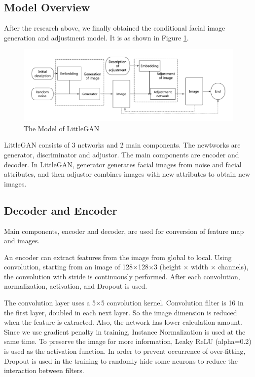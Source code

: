 \subsection{Model Overview}

After the research above, we finally obtained the conditional facial image generation and adjustment model.
 It is as shown in Figure \ref{smliegan}.

\begin{figure}
    \begin{center}
    \includegraphics[width=\textwidth]{figures/model.pdf}
    \caption{The Model of LittleGAN}
    \label{smliegan}
    \end{center}
\end{figure}

LittleGAN consists of 3 networks and 2 main components.
The newtworks are generator, discriminator and adjustor.
The main components are encoder and decoder.
In LittleGAN, generator generates facial images from noise and facial attributes,
    and then adjustor combines images with new attributes to obtain new images.


\subsection{Decoder and Encoder}

Main components, encoder and decoder, are used for conversion of feature map and images.

An encoder can extract features from the image from global to local.
Using convolution, starting from an image of 128×128×3 (height × width × channels),
    the convolution with stride is continuously performed.
After each convolution, normalization, activation, and Dropout is used.

The convolution layer uses a 5×5 convolution kernel.
Convolution filter is 16 in the first layer, doubled in each next layer.
So the image dimension is reduced when the feature is extracted.
    Also, the network has lower calculation amount.
Since we use gradient penalty in training,
    Instance Normalization is used at the same time.
To preserve the image for more information, Leaky ReLU (alpha=0.2) is used as the activation function.
In order to prevent occurrence of over-fitting,
    Dropout is used in the training to randomly hide some neurons to reduce the interaction between filters.


